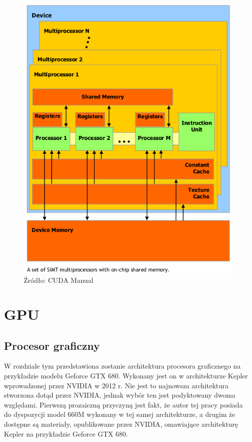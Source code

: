 \begin{figure}[H]
\centering
\includegraphics[scale=0.6]{images/gpu.png}
\caption{Źródło: CUDA Manual}
\end{figure}

\section{GPU}
\subsection{Procesor graficzny}
W rozdziale tym przedstawiona zostanie architektura procesora graficznego na
przykładzie modelu Geforce GTX 680. Wykonany jest on w architekturze Kepler
wprowadzonej przez NVIDIA w 2012 r. Nie jest to najnowsza architektura stworzona
dotąd przez NVIDIA, jednak wybór ten jest podyktowany dwoma
względami. Pierwszą prozaiczną przyczyną jest fakt, że autor tej pracy posiada
do dyspozycji model 660M wykonany w tej samej architekturze, a drugim że
dostępne są materiały, opublikowane przez NVIDIA, omawiające architekturę Kepler
na przykładzie Geforce GTX 680.

